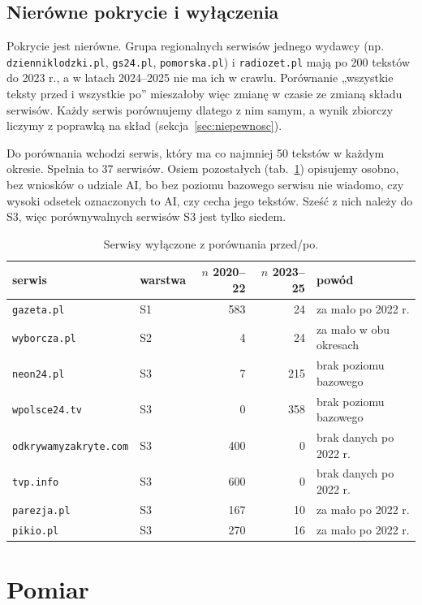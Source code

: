 \documentclass[11pt,a4paper]{article}
\newcommand{\dom}[1]{\texttt{#1}}
\begin{document}
\subsection{Nierówne pokrycie i wyłączenia}

Pokrycie jest nierówne. Grupa regionalnych serwisów jednego wydawcy (np. \dom{dzienniklodzki.pl}, \dom{gs24.pl}, \dom{pomorska.pl}) i \dom{radiozet.pl} mają po 200 tekstów do 2023 r., a w latach 2024--2025 nie ma ich w crawlu. Porównanie „wszystkie teksty przed i wszystkie po” mieszałoby więc zmianę w czasie ze zmianą składu serwisów. Każdy serwis porównujemy dlatego z nim samym, a wynik zbiorczy liczymy z poprawką na skład (sekcja~\ref{sec:niepewnosc}).

Do porównania wchodzi serwis, który ma co najmniej 50 tekstów w każdym okresie. Spełnia to 37 serwisów. Osiem pozostałych (tab.~\ref{tab:wylaczone}) opisujemy osobno, bez wniosków o udziale AI, bo bez poziomu bazowego serwisu nie wiadomo, czy wysoki odsetek oznaczonych to AI, czy cecha jego tekstów. Sześć z nich należy do S3, więc porównywalnych serwisów S3 jest tylko siedem.

\begin{table}[t]
\centering\small
\caption{Serwisy wyłączone z porównania przed/po.}\label{tab:wylaczone}
\begin{tabular}{@{}llrrl@{}}
\toprule
serwis & warstwa & $n$ 2020--22 & $n$ 2023--25 & powód \\
\midrule
\dom{gazeta.pl} & S1 & 583 & 24 & za mało po 2022 r. \\
\dom{wyborcza.pl} & S2 & 4 & 24 & za mało w obu okresach \\
\dom{neon24.pl} & S3 & 7 & 215 & brak poziomu bazowego \\
\dom{wpolsce24.tv} & S3 & 0 & 358 & brak poziomu bazowego \\
\dom{odkrywamyzakryte.com} & S3 & 400 & 0 & brak danych po 2022 r. \\
\dom{tvp.info} & S3 & 600 & 0 & brak danych po 2022 r. \\
\dom{parezja.pl} & S3 & 167 & 10 & za mało po 2022 r. \\
\dom{pikio.pl} & S3 & 270 & 16 & za mało po 2022 r. \\
\bottomrule
\end{tabular}
\end{table}

\section{Pomiar}
\end{document}
